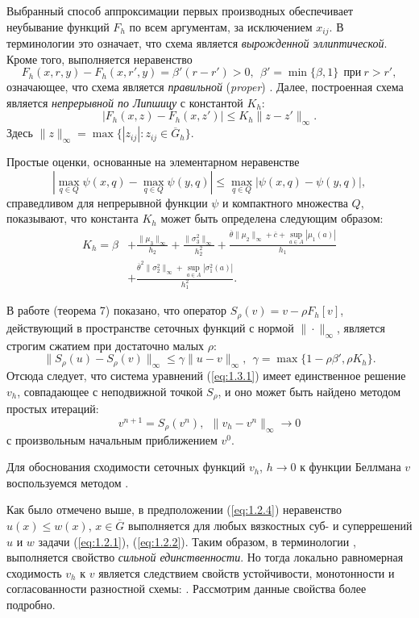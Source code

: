 Выбранный способ аппроксимации первых производных обеспечивает неубывание функций $F_h$ по всем аргументам, за исключением $x_{ij}$. В терминологии \cite{Obe06} это означает, что схема является \emph{вырожденной эллиптической}. Кроме того, выполняется неравенство
$$ F_h(x,r,y)-F_h(x,r',y)=\beta' (r-r')>0, \ \ \beta'=\min\{\beta,1\}\ \ \text{при}\ r>r',$$
означающее, что схема является \emph{правильной} (\emph{proper}) \cite{Obe06}. Далее, построенная схема является \emph{непрерывной по Липшицу} с константой $K_h$:
$$ | F_h(x,z)-F_h(x,z')|\le K_h \|z-z'\|_{\infty}.$$
Здесь $\|z\|_\infty=\max\{|z_{ij}|:z_{ij}\in \overline G_h\}$.

Простые оценки, основанные на элементарном неравенстве
\begin{equation} \label{eq:1.3.2}
|\max_{q\in Q}\psi(x,q)-\max_{q\in Q}\psi(y,q)|\le\max_{q\in Q} |\psi(x,q)-\psi(y,q)|,
\end{equation}
справедливом для непрерывной функции $\psi$ и компактного множества $Q$, показывают, что константа $K_h$ может быть определена следующим образом:
\begin{align*}
K_h=\beta &+ \frac{\|\mu_3\|_\infty}{h_2}+\frac{\|\sigma_3^2\|_\infty}{h_2^2}+
\frac{\overline\theta\|\mu_2\|_\infty+\overline c+\sup_{a\in A}|\mu_1(a)|}{h_1}\\
 &+ \frac{\overline\theta^2 \|\sigma_2^2\|_\infty+\sup_{a\in A}|\sigma_1^2(a)|}{h_1^2}.
\end{align*}

В работе \cite{Obe06} (теорема 7) показано, что оператор $S_\rho(v)=v-\rho F_h[v]$,
действующий в пространстве сеточных функций с нормой $\|\cdot\|_\infty$, является строгим сжатием при достаточно малых $\rho$:
$$ \| S_\rho(u)-S_\rho(v)\|_\infty\le\gamma\|u-v\|_\infty,\ \ \gamma=\max\{1-\rho\beta',\rho K_h\}.$$
Отсюда следует, что система уравнений (\ref{eq:1.3.1}) имеет единственное решение $v_h$, совпадающее с неподвижной точкой $S_\rho$, и оно может быть найдено  методом простых итераций:
\begin{equation}  \label{eq:1.3.3}
 v^{n+1}=S_\rho(v^n),\ \ \|v_h-v^n\|_\infty\to 0
\end{equation}
с произвольным начальным приближением $v^0$.

Для обоснования сходимости сеточных функций $v_h$, $h\to 0$ к функции Беллмана $v$ воспользуемся методом \cite{BarSou91}.

Как было отмечено выше, в предположении (\ref{eq:1.2.4}) неравенство $u(x)\le w(x)$, $x\in\overline G$ выполняется для любых вязкостных суб- и суперрешений $u$ и $w$ задачи (\ref{eq:1.2.1}), (\ref{eq:1.2.2}). Таким образом, в терминологии \cite{BarSou91}, выполняется свойство \emph{сильной единственности}. Но тогда локально равномерная сходимость $v_h$ к $v$ является следствием свойств устойчивости, монотонности и согласованности разностной схемы: \cite[теорема 2.1]{BarSou91}. Рассмотрим данные свойства более подробно.

